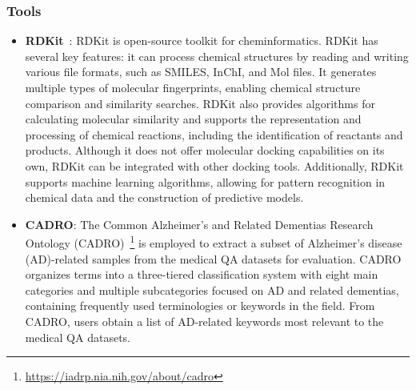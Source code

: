 \subsubsection{Tools}
\begin{itemize}[leftmargin=*]
    \item \textbf{RDKit}~\cite{landrum2013rdkit}: RDKit is open-source toolkit for cheminformatics. RDKit has several key features: it can process chemical structures by reading and writing various file formats, such as SMILES, InChI, and Mol files. It generates multiple types of molecular fingerprints, enabling chemical structure comparison and similarity searches. RDKit also provides algorithms for calculating molecular similarity and supports the representation and processing of chemical reactions, including the identification of reactants and products. Although it does not offer molecular docking capabilities on its own, RDKit can be integrated with other docking tools. Additionally, RDKit supports machine learning algorithms, allowing for pattern recognition in chemical data and the construction of predictive models.
    \item \textbf{CADRO}: The Common Alzheimer’s and Related Dementias Research Ontology (CADRO)~\footnote{\href{https://iadrp.nia.nih.gov/about/cadro}{https://iadrp.nia.nih.gov/about/cadro}} is employed to extract a subset of Alzheimer’s disease (AD)-related samples from the medical QA datasets for evaluation. CADRO organizes terms into a three-tiered classification system with eight main categories and multiple subcategories focused on AD and related dementias, containing frequently used terminologies or keywords in the field. From CADRO, users obtain a list of AD-related keywords most relevant to the medical QA datasets.

\end{itemize}
